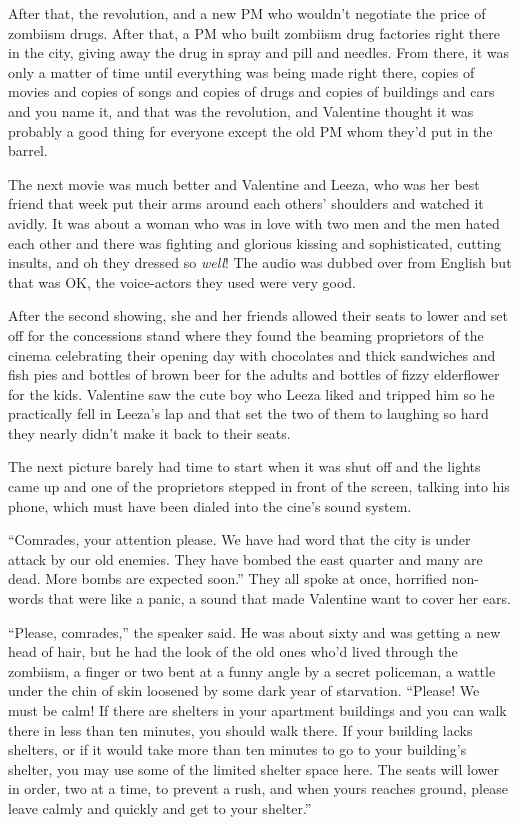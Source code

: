 After that, the revolution, and a new PM who wouldn’t negotiate the
price of zombiism drugs. After that, a PM who built zombiism drug
factories right there in the city, giving away the drug in spray
and pill and needles. From there, it was only a matter of time
until everything was being made right there, copies of movies and
copies of songs and copies of drugs and copies of buildings and
cars and you name it, and that was the revolution, and Valentine
thought it was probably a good thing for everyone except the old PM
whom they’d put in the barrel.

The next movie was much better and Valentine and Leeza, who was her
best friend that week put their arms around each others’ shoulders
and watched it avidly. It was about a woman who was in love with
two men and the men hated each other and there was fighting and
glorious kissing and sophisticated, cutting insults, and oh they
dressed so \emph{well}! The audio was dubbed over from English but
that was OK, the voice-actors they used were very good.

After the second showing, she and her friends allowed their seats
to lower and set off for the concessions stand where they found the
beaming proprietors of the cinema celebrating their opening day
with chocolates and thick sandwiches and fish pies and bottles of
brown beer for the adults and bottles of fizzy elderflower for the
kids. Valentine saw the cute boy who Leeza liked and tripped him so
he practically fell in Leeza’s lap and that set the two of them to
laughing so hard they nearly didn’t make it back to their seats.

The next picture barely had time to start when it was shut off and
the lights came up and one of the proprietors stepped in front of
the screen, talking into his phone, which must have been dialed
into the cine’s sound system.

“Comrades, your attention please. We have had word that the city is
under attack by our old enemies. They have bombed the east quarter
and many are dead. More bombs are expected soon.” They all spoke at
once, horrified non-words that were like a panic, a sound that made
Valentine want to cover her ears.

“Please, comrades,” the speaker said. He was about sixty and was
getting a new head of hair, but he had the look of the old ones
who’d lived through the zombiism, a finger or two bent at a funny
angle by a secret policeman, a wattle under the chin of skin
loosened by some dark year of starvation. “Please! We must be calm!
If there are shelters in your apartment buildings and you can walk
there in less than ten minutes, you should walk there. If your
building lacks shelters, or if it would take more than ten minutes
to go to your building’s shelter, you may use some of the limited
shelter space here. The seats will lower in order, two at a time,
to prevent a rush, and when yours reaches ground, please leave
calmly and quickly and get to your shelter.”

